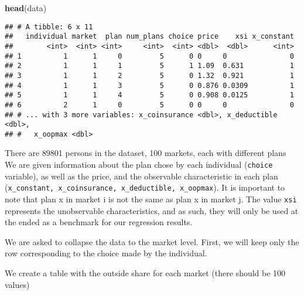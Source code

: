 \documentclass[]{article}
\newenvironment{Shaded}{\begin{snugshade}}{\end{snugshade}}
\newcommand{\DataTypeTok}[1]{\textcolor[rgb]{0.13,0.29,0.53}{#1}}
\newcommand{\DecValTok}[1]{\textcolor[rgb]{0.00,0.00,0.81}{#1}}
\newcommand{\KeywordTok}[1]{\textcolor[rgb]{0.13,0.29,0.53}{\textbf{#1}}}
\newcommand{\NormalTok}[1]{#1}
\newcommand{\OperatorTok}[1]{\textcolor[rgb]{0.81,0.36,0.00}{\textbf{#1}}}
\newcommand{\StringTok}[1]{\textcolor[rgb]{0.31,0.60,0.02}{#1}}
\begin{document}
\begin{Shaded}
\begin{Highlighting}[]
\KeywordTok{head}\NormalTok{(data)}
\end{Highlighting}
\end{Shaded}

\begin{verbatim}
## # A tibble: 6 x 11
##   individual market  plan num_plans choice price    xsi x_constant
##        <int>  <int> <int>     <int>  <int> <dbl>  <dbl>      <int>
## 1          1      1     0         5      0 0     0               0
## 2          1      1     1         5      1 1.09  0.631           1
## 3          1      1     2         5      0 1.32  0.921           1
## 4          1      1     3         5      0 0.876 0.0309          1
## 5          1      1     4         5      0 0.908 0.0125          1
## 6          2      1     0         5      0 0     0               0
## # ... with 3 more variables: x_coinsurance <dbl>, x_deductible <dbl>,
## #   x_oopmax <dbl>
\end{verbatim}

There are 89801 persons in the dataset, 100 markets, each with different
plans We are given information about the plan chose by each individual
(\texttt{choice} variable), as well as the price, and the observable
characteristic in each plan
(\texttt{x\_constant,\ x\_coinsurance,\ x\_deductible,\ x\_oopmax}). It
is important to note that plan x in market i is not the same as plan x
in market j. The value \texttt{xsi} represents the unobservable
characteristics, and as such, they will only be used at the ended as a
benchmark for our regression results.

We are asked to collapse the data to the market level. First, we will
keep only the row corresponding to the choice made by the individual.

We create a table with the outside share for each market (there should
be 100 values)

\begin{Shaded}
\end{Shaded}
\end{document}
